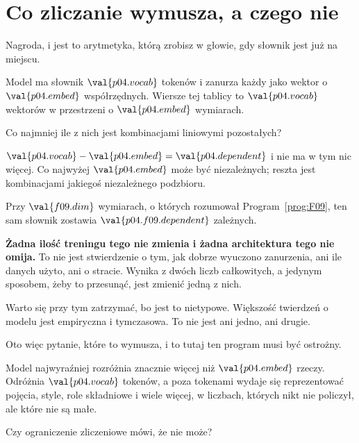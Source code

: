 \section{Co zliczanie wymusza, a czego nie}
\label{sec:P04-counting}

\begin{fr}
Nagroda, i jest to arytmetyka, którą zrobisz w głowie, gdy słownik jest już na
miejscu.

Model ma słownik $\val{p04.vocab}$ tokenów i zanurza każdy jako wektor o
$\val{p04.embed}$ współrzędnych. Wiersze tej tablicy to $\val{p04.vocab}$
wektorów w przestrzeni o $\val{p04.embed}$ wymiarach.

Co najmniej ile z nich jest kombinacjami liniowymi pozostałych?
\nextframe
\end{fr}

\begin{fr}
$\val{p04.vocab} - \val{p04.embed} = \val{p04.dependent}$ i nie ma w tym nic
więcej. Co najwyżej $\val{p04.embed}$ może być niezależnych; reszta jest
kombinacjami jakiegoś niezależnego podzbioru.

Przy $\val{f09.dim}$ wymiarach, o których rozumował Program~\ref{prog:F09}, ten
sam słownik zostawia $\val{p04.f09.dependent}$ zależnych.

\begin{warning}
\textbf{Żadna ilość treningu tego nie zmienia i żadna architektura tego nie
omija.} To nie jest stwierdzenie o tym, jak dobrze wyuczono zanurzenia, ani ile
danych użyto, ani o stracie. Wynika z dwóch liczb całkowitych, a jedynym
sposobem, żeby to przesunąć, jest zmienić jedną z nich.

Warto się przy tym zatrzymać, bo jest to nietypowe. Większość twierdzeń o
modelu jest empiryczna i tymczasowa. To nie jest ani jedno, ani drugie.
\end{warning}
\end{fr}

\begin{fr}
Oto więc pytanie, które to wymusza, i to tutaj ten program musi być ostrożny.

Model najwyraźniej rozróżnia znacznie więcej niż $\val{p04.embed}$ rzeczy.
Odróżnia $\val{p04.vocab}$ tokenów, a poza tokenami wydaje się reprezentować
pojęcia, style, role składniowe i wiele więcej, w liczbach, których nikt nie
policzył, ale które nie są małe.

Czy ograniczenie zliczeniowe mówi, że nie może?
\nextframe
\end{fr}

